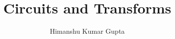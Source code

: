 \documentclass[journal,12pt,twocolumn]{IEEEtran}
\begin{document}
\let\StandardTheFigure\thefigure
\renewcommand{\thefigure}{\theproblem}



\def\putbox#1#2#3{\makebox[0in][l]{\makebox[#1][l]{}\raisebox{\baselineskip}[0in][0in]{\raisebox{#2}[0in][0in]{#3}}}}
     \def\rightbox#1{\makebox[0in][r]{#1}}
     \def\centbox#1{\makebox[0in]{#1}}
     \def\topbox#1{\raisebox{-\baselineskip}[0in][0in]{#1}}
     \def\midbox#1{\raisebox{-0.5\baselineskip}[0in][0in]{#1}}

\vspace{3cm}

\title{ 
Circuits and Transforms
}


%
%
%

\author{ Himanshu Kumar Gupta%
}
% 
%
\end{document}
